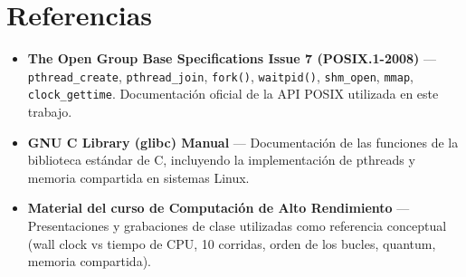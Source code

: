 
\section{Referencias}
\begin{itemize}
    \item \textbf{The Open Group Base Specifications Issue 7 (POSIX.1-2008)} — \texttt{pthread\_create}, \texttt{pthread\_join}, \texttt{fork()}, \texttt{waitpid()}, \texttt{shm\_open}, \texttt{mmap}, \texttt{clock\_gettime}. Documentación oficial de la API POSIX utilizada en este trabajo.
    \item \textbf{GNU C Library (glibc) Manual} — Documentación de las funciones de la biblioteca estándar de C, incluyendo la implementación de pthreads y memoria compartida en sistemas Linux.
    \item \textbf{Material del curso de Computación de Alto Rendimiento} — Presentaciones y grabaciones de clase utilizadas como referencia conceptual (wall clock vs tiempo de CPU, 10 corridas, orden de los bucles, quantum, memoria compartida).
\end{itemize}
